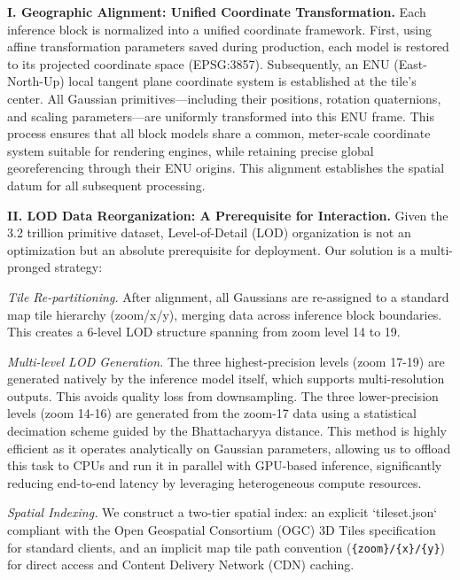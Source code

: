 \documentclass{llmxive}
\providecommand{\paragraph}[1]{\noindent\textbf{#1.}\hspace*{1em}}
\begin{document}
\paragraph{I. Geographic Alignment: Unified Coordinate Transformation}
Each inference block is normalized into a unified coordinate framework. First, using affine transformation parameters saved during production, each model is restored to its projected coordinate space (EPSG:3857). Subsequently, an ENU (East-North-Up) local tangent plane coordinate system is established at the tile's center. All Gaussian primitives—including their positions, rotation quaternions, and scaling parameters—are uniformly transformed into this ENU frame. This process ensures that all block models share a common, meter-scale coordinate system suitable for rendering engines, while retaining precise global georeferencing through their ENU origins. This alignment establishes the spatial datum for all subsequent processing.

\paragraph{II. LOD Data Reorganization: A Prerequisite for Interaction}
Given the 3.2 trillion primitive dataset, Level-of-Detail (LOD) organization is not an optimization but an absolute prerequisite for deployment. Our solution is a multi-pronged strategy:

\textit{Tile Re-partitioning.} After alignment, all Gaussians are re-assigned to a standard map tile hierarchy (zoom/x/y), merging data across inference block boundaries. This creates a 6-level LOD structure spanning from zoom level 14 to 19.

\textit{Multi-level LOD Generation.} The three highest-precision levels (zoom 17-19) are generated natively by the inference model itself, which supports multi-resolution outputs. This avoids quality loss from downsampling. The three lower-precision levels (zoom 14-16) are generated from the zoom-17 data using a statistical decimation scheme guided by the Bhattacharyya distance. This method is highly efficient as it operates analytically on Gaussian parameters, allowing us to offload this task to CPUs and run it in parallel with GPU-based inference, significantly reducing end-to-end latency by leveraging heterogeneous compute resources.

\textit{Spatial Indexing.} We construct a two-tier spatial index: an explicit `tileset.json` compliant with the Open Geospatial Consortium (OGC) 3D Tiles specification \cite{ogc2023referencing} for standard clients, and an implicit map tile path convention (\texttt{\{zoom\}/\{x\}/\{y\}}) for direct access and Content Delivery Network (CDN) caching.
\end{document}
